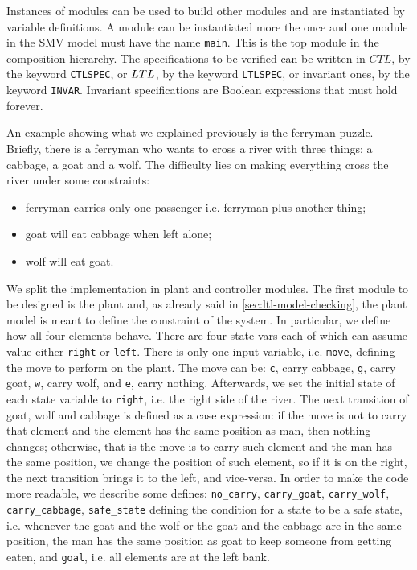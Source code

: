 Instances of modules can be used to build other modules and are instantiated by variable definitions. A module can be instantiated more the once and one module in the SMV model must have the name \lstinline{main}. This is the top module in
the composition hierarchy. The specifications to be verified can be written in $CTL$, by the keyword \lstinline{CTLSPEC}, or $LTL$, by the keyword \lstinline{LTLSPEC}, or invariant ones, by the keyword \lstinline{INVAR}. 
Invariant specifications are Boolean expressions that must hold forever.

An example showing what we explained previously is the ferryman puzzle.
Briefly, there is a ferryman who wants to cross a river with three things: a cabbage, a goat and a wolf. The difficulty lies on making everything cross the river under some constraints:
\begin{itemize}
    \item ferryman carries only one passenger i.e. ferryman plus another thing;
    \item goat will eat cabbage when left alone;
    \item wolf will eat goat.
\end{itemize}
We split the implementation in plant and controller modules.
The first module to be designed is the plant and, as already said in \autoref{sec:ltl-model-checking}, the plant model is meant to define the constraint of the system. 
In particular, we define how all four elements behave. 
There are four state vars each of which can assume value either \lstinline{right} or \lstinline{left}. 
There is only one input variable, i.e. \lstinline{move}, defining the move to perform on the plant. 
The move can be: \lstinline{c}, carry cabbage, \lstinline{g}, carry goat, \lstinline{w}, carry wolf, and \lstinline{e}, carry nothing.
Afterwards, we set the initial state of each state variable to \lstinline{right}, i.e. the right side of the river. 
The next transition of goat, wolf and cabbage is defined as a case expression: if the move is not to carry that element and the element has the same position as man, then nothing changes; otherwise, that is the move is to carry such element and the man has the same position, we change the position of such element, so if it is on the right, the next transition brings it to the left, and vice-versa.
In order to make the code more readable, we describe some defines: \lstinline{no_carry}, \lstinline{carry_goat}, \lstinline{carry_wolf}, \lstinline{carry_cabbage},  \lstinline{safe_state} defining the condition for a state to be a safe state, i.e. whenever the goat and the wolf or the goat and the cabbage are in the same position, the man has the same position as goat to keep someone from getting eaten, and \lstinline{goal}, i.e. all elements are at the left bank.

